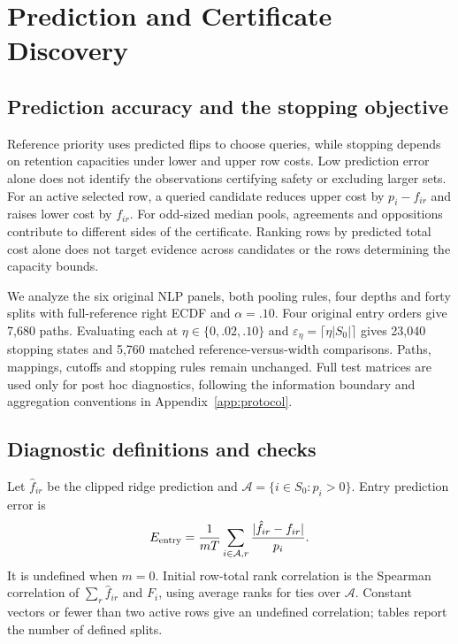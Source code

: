 \section{Prediction and Certificate Discovery}
\label{app:acquisition-diagnostics}
\subsection{Prediction accuracy and the stopping objective}
Reference priority uses predicted flips to choose queries, while stopping depends on retention capacities under lower and upper row costs. Low prediction error alone does not identify the observations certifying safety or excluding larger sets. For an active selected row, a queried candidate reduces upper cost by $p_i-f_{ir}$ and raises lower cost by $f_{ir}$. For odd-sized median pools, agreements and oppositions contribute to different sides of the certificate. Ranking rows by predicted total cost alone does not target evidence across candidates or the rows determining the capacity bounds.

We analyze the six original NLP panels, both pooling rules, four depths and forty splits with full-reference right ECDF and $\alpha=.10$. Four original entry orders give 7,680 paths. Evaluating each at $\eta\in\{0,.02,.10\}$ and $\varepsilon_\eta=\lceil\eta|S_0|\rceil$ gives 23,040 stopping states and 5,760 matched reference-versus-width comparisons. Paths, mappings, cutoffs and stopping rules remain unchanged. Full test matrices are used only for post hoc diagnostics, following the information boundary and aggregation conventions in Appendix~\ref{app:protocol}.

\subsection{Diagnostic definitions and checks}
Let $\hat f_{ir}$ be the clipped ridge prediction and $\mathcal A=\{i\in S_0:p_i>0\}$. Entry prediction error is
\[
 E_{\rm entry}=\frac{1}{mT}\sum_{i\in\mathcal A,r}\frac{|\hat f_{ir}-f_{ir}|}{p_i}.
\]
It is undefined when $m=0$. Initial row-total rank correlation is the Spearman correlation of $\sum_r\hat f_{ir}$ and $F_i$, using average ranks for ties over $\mathcal A$. Constant vectors or fewer than two active rows give an undefined correlation; tables report the number of defined splits.

